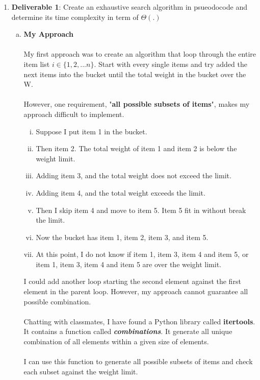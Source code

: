 \documentclass[11pt]{article}
\begin{document}
\begin{enumerate}
	\item  \textbf{Deliverable 1}: Create an exhaustive search algorithm in psueodocode and determine its time complexity
	 in term of $\Theta (.)$
	\begin{enumerate}[(a)]
		\item
		\textbf{My Approach} \\\\
		My first approach was to create an algorithm that loop through the entire item list
		 $i \in \{1, 2, ... n\}$. Start with every single items and try added the next items into
		 the bucket until the total weight in the bucket over the W. \\\\
		However, one requirement, "\textbf{all possible subsets of items}", makes my approach
		 difficult to implement.  
			\begin{enumerate}[(i)]
				\item
				Suppose I put item 1 in the bucket.
				\item
				Then item 2. The total weight of item 1 and item 2 is below the weight limit.
				\item
				Adding item 3, and the total weight does not exceed the limit.
				\item
				Adding item 4, and the total weight exceeds the limit.
				\item
				Then I skip item 4 and move to item 5. Item 5 fit in without break the limit.
				\item
				Now the bucket has item 1, item 2, item 3, and item 5.
				\item
				At this point, I do not know if item 1, item 3, item 4 and item 5, or item 1, item
				 3, item 4 and item 5 are over the weight limit.
			\end{enumerate}
		I could add another loop starting the second element against the first element in the
		 parent loop. However, my approach cannot guarantee all possible combination. \\\\
		Chatting with classmates, I have found a Python library called \textbf{itertools}. It
		contains a function called \textbf{\textit{combinations}}. It generate all unique
		combination of all elements within a given size of elements. \\\\
		I can use this function to generate all possible subsets of items and check each subset 
		 against the weight limit. \\\\


\end{enumerate}
\end{enumerate}
\end{document}
